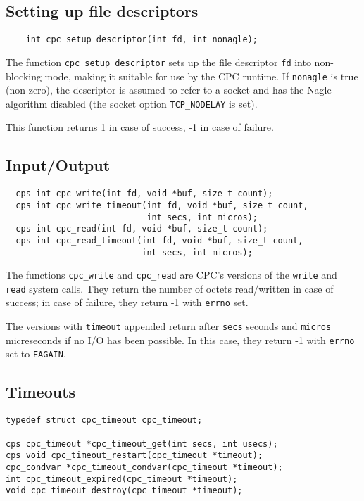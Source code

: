 \documentclass[a4paper]{report}
\begin{document}
\subsection{Setting up file descriptors}

\begin{verbatim}
    int cpc_setup_descriptor(int fd, int nonagle);
\end{verbatim}

The function \verb|cpc_setup_descriptor| sets up the file descriptor
\verb|fd| into non-blocking mode, making it suitable for use by the
CPC runtime.  If \verb|nonagle| is true (non-zero), the descriptor is
assumed to refer to a socket and has the Nagle algorithm disabled (the
socket option \verb|TCP_NODELAY| is set).

This function returns 1 in case of success, -1 in case of failure.

\subsection{Input/Output}
\begin{verbatim}
  cps int cpc_write(int fd, void *buf, size_t count);
  cps int cpc_write_timeout(int fd, void *buf, size_t count,
                            int secs, int micros);
  cps int cpc_read(int fd, void *buf, size_t count);
  cps int cpc_read_timeout(int fd, void *buf, size_t count,
                           int secs, int micros);
\end{verbatim}

The functions \verb|cpc_write| and \verb|cpc_read| are CPC's versions
of the \verb|write| and \verb|read| system calls.  They return the
number of octets read/written in case of success; in case of failure,
they return -1 with \verb|errno| set.

The versions with \verb|timeout| appended return after \verb|secs|
seconds and \verb|micros| micreseconds if no I/O has been possible.
In this case, they return -1 with \verb|errno| set to \verb|EAGAIN|.

\subsection{Timeouts}

\begin{verbatim}
typedef struct cpc_timeout cpc_timeout;

cps cpc_timeout *cpc_timeout_get(int secs, int usecs);
cps void cpc_timeout_restart(cpc_timeout *timeout);
cpc_condvar *cpc_timeout_condvar(cpc_timeout *timeout);
int cpc_timeout_expired(cpc_timeout *timeout);
void cpc_timeout_destroy(cpc_timeout *timeout);
\end{verbatim}
\end{document}
